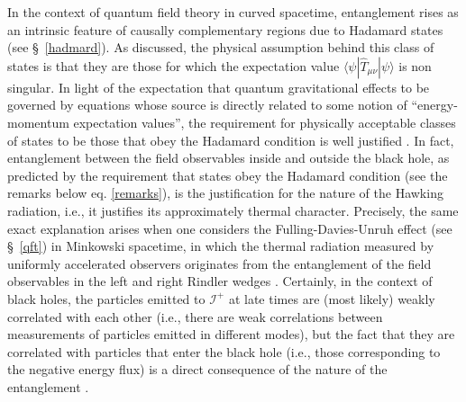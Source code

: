\documentclass[
12pt,		%
openright,	%
twoside,  %
a4paper,			%
chapter=TITLE,		%
english,			%
french,				%
spanish,			%
brazil				%
]{USPSC-classe/USPSC}
\begin{document}
In the context of quantum field theory in curved spacetime, entanglement rises as an intrinsic feature of causally complementary regions due to Hadamard states (see \S~\ref{hadmard}). As discussed, the physical assumption behind this class of states is that they are those for which the expectation value $\langle \psi|\hat{T}_{\mu\nu}|\psi\rangle$ is non singular. In light of the expectation that quantum gravitational effects to be governed by equations whose source is directly related to some notion of ``energy-momentum expectation values'', the requirement for physically acceptable classes of states to be those that obey the Hadamard condition is well justified \cite{Wald1994}. In fact, entanglement between the field observables inside and outside the black hole, as predicted by the requirement that states obey the Hadamard condition (see the remarks below eq. \ref{remarks}), is the justification for the nature of the Hawking radiation, i.e., it justifies its approximately thermal character. Precisely, the same exact explanation arises when one considers the Fulling-Davies-Unruh effect (see \S~\ref{qft}) in Minkowski spacetime, in which the thermal radiation measured by uniformly accelerated observers originates from the entanglement of the field observables in the left and right Rindler wedges \cite{Wald1994}. Certainly, in the context of black holes, the particles emitted to $\mathscr{I}^+$ at late times are (most likely) weakly correlated with each other (i.e., there are weak correlations between measurements of particles emitted in different modes), but the fact that they are correlated with particles that enter the black hole (i.e., those corresponding to the negative energy flux) is a direct consequence of the nature of the entanglement \cite{Unruh2005, Unruh2017}.
\end{document}
